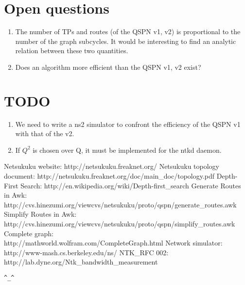 \documentclass[a4paper]{article}
\newcommand{\href}[2]{ #1 }
\begin{document}
\section{Open questions}
\begin{enumerate}
	\item The number of TPs and routes (of the QSPN v1, v2) is
		proportional to the number of the graph subcycles. It would be
		interesting to find an analytic relation between these two
		quantities.
	\item Does an algorithm more efficient than the QSPN v1, v2 exist?
\end{enumerate}

\section{TODO}
\begin{enumerate}
	\item We need to write a ns2 \cite{ns2} simulator to confront the efficiency of the
		QSPN v1 with that of the v2.
	\item If $Q^2$ is chosen over Q, it must be implemented for the
		ntkd daemon.
\end{enumerate}


\begin{thebibliography}{99}
	 Netsukuku website:
		\href{http://netsukuku.freaknet.org/}{http://netsukuku.freaknet.org/}
	 Netsukuku topology document:
		\href{http://netsukuku.freaknet.org/doc/main\_doc/topology.pdf}{topology.pdf}
	 Depth-First Search:
		\href{http://en.wikipedia.org/wiki/Depth-first\_search}{http://en.wikipedia.org/wiki/Depth-first\_search}
	 Generate Routes in Awk:
		\ifpdf \else \\ \fi
		\href{http://cvs.hinezumi.org/viewcvs/netsukuku/proto/qspn/generate\_routes.awk}{generate\_routes.awk}
	 Simplify Routes in Awk:
		\ifpdf \else \\ \fi
		\href{http://cvs.hinezumi.org/viewcvs/netsukuku/proto/qspn/simplify\_routes.awk}{simplify\_routes.awk}
	 Complete graph:
		\ifpdf \else \\ \fi
		\href{http://mathworld.wolfram.com/CompleteGraph.html}{http://mathworld.wolfram.com/}
	 Network simulator:
		\ifpdf \else \\ \fi
		\href{http://www-mash.cs.berkeley.edu/ns/}{http://www-mash.cs.berkeley.edu/ns/}
	 NTK\_RFC 002:
		\href{http://lab.dyne.org/Ntk\_bandwidth\_measurement}{Bandwidth
		measurement}
\end{thebibliography}
\newpage

\begin{center}
\verb|^_^|
\end{center}
\end{document}

